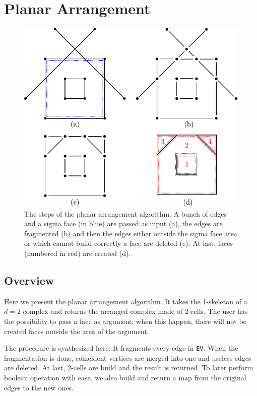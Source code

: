 \chapter{Planar Arrangement}
\label{ch:planar_arrangement}

\begin{figure}[h]
    \centering
    \includegraphics{./img/ch2-planararrangement.pdf}
    \caption{
        The steps of the planar arrangement algorithm.
        A bunch of edges and a sigma face (in blue) are passed as input (a), the edges
        are fragmented (b) and then the edges either outside the sigma face area or which
        cannot build correctly a face are deleted (c). At last, faces (numbered in red) 
        are created (d).
    }
\end{figure}

\section{Overview}
\label{sec:planar_arrangement_overview}

Here we present the planar arrangement algorithm. It takes the 1-skeleton of a $d=2$ complex and returns 
the arranged complex made of 2-cells. The user has the possibility to pass a face as argument; when this happen,
there will not be created faces outside the area of the argument.

The procedure is synthesized here:
It fragments every edge in \texttt{EV}. 
When the fragmentation is done, coincident vertices are merged into one and useless edges are deleted. At last,
2-cells are build and the result is returned.
To later perform boolean operation with ease, we also build and return a map from the original
edges to the new ones.

